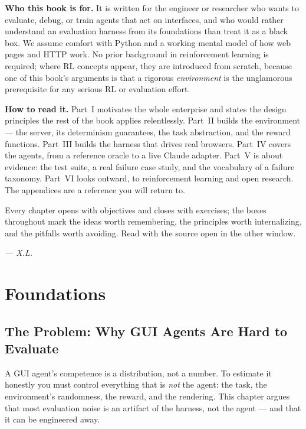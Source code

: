 \documentclass[11pt,openany]{book}
\begin{document}
\textbf{Who this book is for.} It is written for the engineer or researcher who
wants to evaluate, debug, or train agents that act on interfaces, and who would
rather understand an evaluation harness from its foundations than treat it as a
black box. We assume comfort with Python and a working mental model of how web
pages and HTTP work. No prior background in reinforcement learning is required;
where RL concepts appear, they are introduced from scratch, because one of this
book's arguments is that a rigorous \emph{environment} is the unglamorous
prerequisite for any serious RL or evaluation effort.

\textbf{How to read it.} Part~I motivates the whole enterprise and states the
design principles the rest of the book applies relentlessly. Part~II builds the
environment — the server, its determinism guarantees, the task abstraction, and
the reward functions. Part~III builds the harness that drives real browsers.
Part~IV covers the agents, from a reference oracle to a live Claude adapter.
Part~V is about evidence: the test suite, a real failure case study, and the
vocabulary of a failure taxonomy. Part~VI looks outward, to reinforcement
learning and open research. The appendices are a reference you will return to.

Every chapter opens with objectives and closes with exercises; the boxes
throughout mark the ideas worth remembering, the principles worth internalizing,
and the pitfalls worth avoiding. Read with the source open in the other window.

\vspace{1em}
\hfill\textit{— X.L.}

\cleardoublepage
\pagestyle{plain}
\tableofcontents

\mainmatter
\pagestyle{fancy}

\part{Foundations}

\chapter{The Problem: Why GUI Agents Are Hard to Evaluate}
\label{ch:problem}

\begin{keybox}[.\ ]
A GUI agent's competence is a distribution, not a number. To estimate it
honestly you must control everything that is \emph{not} the agent: the task, the
environment's randomness, the reward, and the rendering. This chapter argues that
most evaluation noise is an artifact of the harness, not the agent — and that it
can be engineered away.
\end{keybox}
\end{document}
